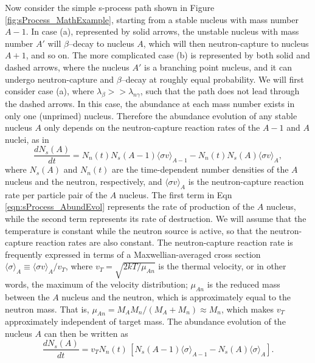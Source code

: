 Now consider the simple s-process path shown in Figure \ref{fig:sProcess_MathExample}, starting from a stable nucleus with mass number $A-1$. In case (a), represented by solid arrows, the unstable nucleus with mass number $A'$ will $\beta$--decay to nucleus $A$, which will then neutron-capture to nucleus $A+1$, and so on. The more complicated case (b) is represented by both solid and dashed arrows, where the nucleus $A'$ is a branching point nucleus, and it can undergo neutron-capture and $\beta$--decay at roughly equal probability. We will first consider case (a), where $\lambda_{\beta} >> \lambda_{n\gamma}$, such that the path does not lead through the dashed arrows. In this case, the abundance at each mass number exists in only one (unprimed) nucleus. Therefore the abundance evolution of any stable nucleus $A$ only depends on the neutron-capture reaction rates of the $A-1$ and $A$ nuclei, as in
\begin{equation} \label{eqn:sProcess_AbundEvol}
\frac{dN_{s}(A)}{dt} = N_{n}(t)N_{s}(A-1)\langle \sigma v \rangle_{A-1} - N_{n}(t)N_{s}(A)\langle \sigma v \rangle_{A},
\end{equation}
where $N_{s}(A)$ and $N_{n}(t)$ are the time-dependent number densities of the $A$ nucleus and the neutron, respectively, and $\langle \sigma v \rangle_{A}$ is the neutron-capture reaction rate per particle pair of the $A$ nucleus. The first term in Eqn \ref{eqn:sProcess_AbundEvol} represents the rate of production of the $A$ nucleus, while the second term represents its rate of destruction. We will assume that the temperature is constant while the neutron source is active, so that the neutron-capture reaction rates are also constant. The neutron-capture reaction rate is frequently expressed in terms of a Maxwellian-averaged cross section $\langle \sigma \rangle_{A} \equiv \langle \sigma v \rangle_{A} / v_{T}$, where $v_{T} = \sqrt{2kT/\mu_{An}}$ is the thermal velocity, or in other words, the maximum of the velocity distribution; $\mu_{An}$ is the reduced mass between the $A$ nucleus and the neutron, which is approximately equal to the neutron mass. That is, $\mu_{An} = M_{A}M_{n}/(M_{A} + M_{n}) \approx M_{n}$, which makes $v_{T}$ approximately independent of target mass. The abundance evolution of the nucleus $A$ can then be written as
\begin{equation}
\frac{dN_{s}(A)}{dt} = v_{T}N_{n}(t) \, \left[ N_{s}(A-1)\langle \sigma \rangle_{A-1} - N_{s}(A)\langle \sigma \rangle_{A} \right].
\end{equation}

